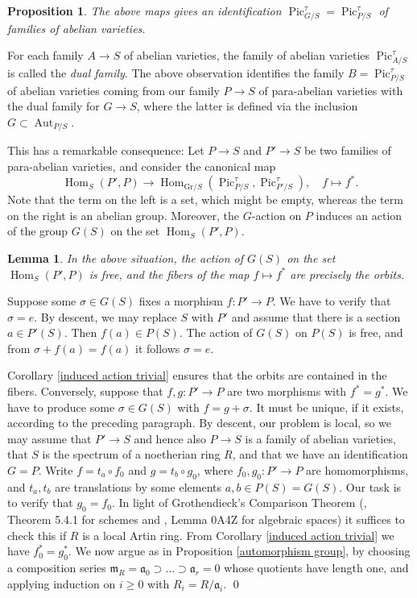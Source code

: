 \documentclass[oneside, 12pt]{amsart}
\newcommand\mylabel[1]{\label{#1}\marginpar{\raggedright\vspace{-1ex}\medskip\medskip\footnotesize \tt #1}}
\renewcommand\mylabel[1]{\label{#1}}
\newtheorem{lemma}[theorem]{Lemma}
\newtheorem{proposition}[theorem]{Proposition}
\theoremstyle{definition}
\theoremstyle{remark}
\newcommand{\ideala}{\mathfrak{a}}
\newcommand{\Aut}{\operatorname{Aut}}
\newcommand{\Hom}{\operatorname{Hom}}
\newcommand{\lra}{\longrightarrow}
\newcommand{\maxid}{\mathfrak{m}}
\newcommand{\Pic}{\operatorname{Pic}}
\newcommand{\ra}{\rightarrow}
\begin{document}
\begin{proposition}
The above maps gives  an identification $\Pic^\tau_{G/S}=\Pic^\tau_{P/S}$ of families of abelian varieties.
\end{proposition}

For each family $A\ra S$ of abelian varieties, the   family of abelian varieties $\Pic^\tau_{A/S}$
is called the \emph{dual family}. 
The above observation identifies  the family $B=\Pic^\tau_{P/S}$ of abelian varieties  coming
from our family $P\ra S$ of para-abelian varieties  with the dual family for $G\ra S$, where  the latter is
defined via the inclusion $G\subset\Aut_{P/S}$.

This has a remarkable consequence:
Let $P\ra S$ and $P'\ra S$ be two families of  para-abelian varieties, and consider the canonical map
$$
\Hom_S(P',P)\lra \Hom_{\text{Gr}/S}(\Pic^\tau_{P/S},\Pic^\tau_{P'/S}),\quad f\longmapsto f^*.
$$
Note that the term on the left is   a set, which might be empty,
whereas the term on the right is an abelian group. Moreover, the $G$-action   on $P$ induces an action of the group  $G(S)$ on the set $\Hom_S(P',P)$.
 

\begin{lemma}
\mylabel{orbits in hom-set}
In the above situation, the action of    $G(S)$ on the set $\Hom_S(P',P)$ is free,
and the   fibers of the map $f\mapsto f^*$ are precisely the orbits.
\end{lemma}

\proof
Suppose some $\sigma\in G(S)$ fixes a morphism $f:P'\ra P$.
We have to verify that $\sigma=e$. By descent, we may replace
$S$ with $P'$ and assume that there is a section $a\in P'(S)$.
Then $f(a)\in P(S)$.  The action of $G(S)$ on $P(S)$ is free, and  from $\sigma + f(a) = f(a)$ it follows $\sigma=e$.

Corollary \ref{induced action trivial} ensures that the orbits are contained in the fibers.
Conversely, suppose that $f,g:P'\ra P$ are two morphisms with $f^*=g^*$.
We have to produce some $\sigma\in G(S)$ with $f=g+\sigma$.
It must be unique, if it exists, according to the preceding paragraph.
By descent, our problem is local, so we     may assume that $P'\ra S$ and hence also $P\ra S$ is a family of abelian varieties,
that $S$ is the spectrum of a noetherian ring $R$, and that we  have  an identification $G=P$.
Write $f= t_a\circ f_0$ and $g=t_b\circ g_0$, where $f_0,g_0:P'\ra P$ are homomorphisms,
and $t_a,t_b$ are translations by some elements $a,b\in P(S)=G(S)$.
Our task is to verify that $g_0=f_0$. In light of 
Grothendieck's Comparison Theorem (\cite{EGA IIIa}, Theorem 5.4.1 for schemes  and \cite{SP},  
Lemma 0A4Z for algebraic spaces)
it suffices to check
this if $R$ is a local Artin ring.
From Corollary \ref{induced action trivial} we have  $f_0^*=g_0^*$.
We now argue as in  Proposition \ref{automorphism group}, by choosing a composition series
$\maxid_R=\ideala_0\supset \ldots\supset\ideala_r=0$ whose quotients have length one,
and applying  induction on $i\geq 0$ with $R_i=R/\ideala_i$.
\qed
\end{document}
